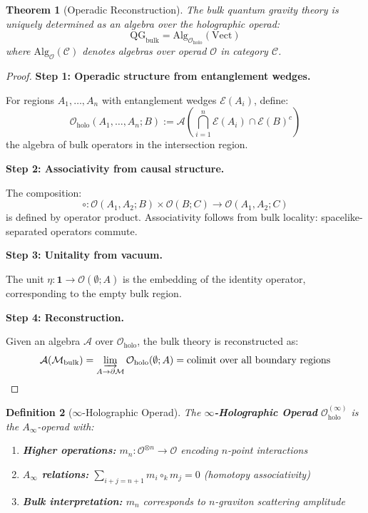 \documentclass[12pt,a4paper]{article}
\newtheorem{theorem}{Theorem}[section]
\newtheorem{definition}[theorem]{Definition}
\begin{document}
\begin{theorem}[Operadic Reconstruction]\label{thm:operadic-reconstruction}
The bulk quantum gravity theory is uniquely determined as an algebra over the holographic operad:
\begin{equation}
\text{QG}_{\text{bulk}} = \text{Alg}_{\mathcal{O}_{\text{holo}}}(\text{Vect})
\end{equation}
where $\text{Alg}_{\mathcal{O}}(\mathcal{C})$ denotes algebras over operad $\mathcal{O}$ in category $\mathcal{C}$.
\end{theorem}

\begin{proof}
\textbf{Step 1: Operadic structure from entanglement wedges.}

For regions $A_1, \ldots, A_n$ with entanglement wedges $\mathcal{E}(A_i)$, define:
\begin{equation}
\mathcal{O}_{\text{holo}}(A_1, \ldots, A_n; B) := \mathcal{A}\left( \bigcap_{i=1}^n \mathcal{E}(A_i) \cap \mathcal{E}(B)^c \right)
\end{equation}
the algebra of bulk operators in the intersection region.

\textbf{Step 2: Associativity from causal structure.}

The composition:
\begin{equation}
\circ: \mathcal{O}(A_1, A_2; B) \times \mathcal{O}(B; C) \to \mathcal{O}(A_1, A_2; C)
\end{equation}
is defined by operator product. Associativity follows from bulk locality: spacelike-separated operators commute.

\textbf{Step 3: Unitality from vacuum.}

The unit $\eta: \mathbf{1} \to \mathcal{O}(\emptyset; A)$ is the embedding of the identity operator, corresponding to the empty bulk region.

\textbf{Step 4: Reconstruction.}

Given an algebra $\mathcal{A}$ over $\mathcal{O}_{\text{holo}}$, the bulk theory is reconstructed as:
\begin{equation}
\mathcal{A}(\mathcal{M}_{\text{bulk}}) = \varinjlim_{A \to \partial\mathcal{M}} \mathcal{O}_{\text{holo}}(\emptyset; A) = \text{colimit over all boundary regions}
\end{equation}
\end{proof}

\begin{definition}[$\infty$-Holographic Operad]\label{def:infty-holo-operad}
The \textbf{$\infty$-Holographic Operad} $\mathcal{O}_{\text{holo}}^{(\infty)}$ is the $A_\infty$-operad with:
\begin{enumerate}
    \item \textbf{Higher operations:} $m_n: \mathcal{O}^{\otimes n} \to \mathcal{O}$ encoding $n$-point interactions
    \item \textbf{$A_\infty$ relations:} $\sum_{i+j=n+1} m_i \circ_k m_j = 0$ (homotopy associativity)
    \item \textbf{Bulk interpretation:} $m_n$ corresponds to $n$-graviton scattering amplitude
\end{enumerate}
\end{definition}
\end{document}
